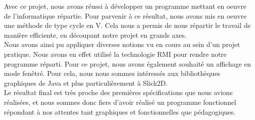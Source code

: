 Avec ce projet, nous avons réussi à développer un programme mettant en oeuvre de l'informatique répartie. Pour parvenir à ce résultat, nous avons mis en oeuvre une méthode de type cycle en V. Cela nous a permis de nous répartir le travail de manière efficiente, en découpant notre projet en grands axes. \\

Nous avons ainsi pu appliquer diverses notions vu en cours au sein d'un projet pratique. Nous avons en effet utilisé la technologie RMI pour rendre notre programme réparti. Pour ce projet, nous avons également souhaité un affichage en mode fenêtré. Pour cela, nous nous sommes intéressés aux bibliothèques graphiques de Java et plus particulièrement à Slick2D. \\

Le résultat final est très proche des premières spécifications que nous avions réalisées, et nous sommes donc fiers d'avoir réalisé un programme fonctionnel répondant à nos attentes tant graphiques et fonctionnelles que pédagogiques.
